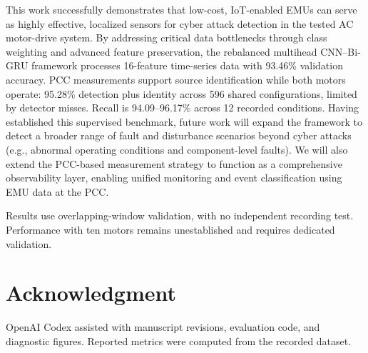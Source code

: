 \documentclass[conference,letterpaper]{IEEEtran}
\begin{document}
This work successfully demonstrates that low-cost, IoT-enabled EMUs can serve as highly effective, localized sensors for cyber attack detection in the tested AC motor-drive system. By addressing critical data bottlenecks through class weighting and advanced feature preservation, the rebalanced multihead CNN--Bi-GRU framework processes 16-feature time-series data with 93.46\% validation accuracy. PCC measurements support source identification while both motors operate: 95.28\% detection plus identity across 596 shared configurations, limited by detector misses. Recall is 94.09--96.17\% across 12 recorded conditions. Having established this supervised benchmark, future work will expand the framework to detect a broader range of fault and disturbance scenarios beyond cyber attacks (e.g., abnormal operating conditions and component-level faults). We will also extend the PCC-based measurement strategy to function as a comprehensive observability layer, enabling unified monitoring and event classification using EMU data at the PCC.

Results use overlapping-window validation, with no independent recording test. Performance with ten motors remains unestablished and requires dedicated validation.

\section*{Acknowledgment}
OpenAI Codex assisted with manuscript revisions, evaluation code, and diagnostic figures. Reported metrics were computed from the recorded dataset.



\end{document}
